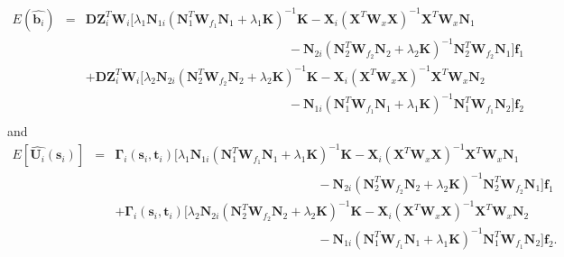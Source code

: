 \documentclass[article,lineno]{biometrika}
\begin{document}
\begin{eqnarray*}
E(\hat {\boldsymbol b_i}) 
&=& 
\boldsymbol D \boldsymbol Z_i^T \boldsymbol W_i 
[
\lambda_1 \boldsymbol N_{1i}
 (\boldsymbol N_1^T \boldsymbol W_{f_1}  \boldsymbol N_1 + \lambda_1 \boldsymbol K)^{-1}  
\boldsymbol K
-  
\boldsymbol X_i(\boldsymbol X^T  \boldsymbol W_x \boldsymbol X )^{-1} \boldsymbol X^T  \boldsymbol W_x  \boldsymbol N_1
\\
&& 
\quad\quad\quad\quad \quad \quad \quad \quad \quad \quad \quad \quad \quad \quad\quad \quad
-
 \boldsymbol N_{2i}
(\boldsymbol N_2^T \boldsymbol W_{f_2}  \boldsymbol N_2 + \lambda_2 \boldsymbol K)^{-1}  \boldsymbol N_2^T \boldsymbol W_{f_2} 
\boldsymbol N_{1} 
 ]
  \boldsymbol f_1  
\\
&& 
+
\boldsymbol D \boldsymbol Z_i^T \boldsymbol W_i 
[
\lambda_2 \boldsymbol N_{2i}
(\boldsymbol N_2^T \boldsymbol W_{f_2}  \boldsymbol N_2 + \lambda_2 \boldsymbol K)^{-1}
  \boldsymbol K
-  
\boldsymbol X_i(\boldsymbol X^T  \boldsymbol W_x \boldsymbol X )^{-1} \boldsymbol X^T  \boldsymbol W_x  \boldsymbol N_2
\\
&& 
\quad\quad\quad\quad \quad \quad \quad \quad \quad \quad \quad \quad \quad \quad\quad \quad
-
 \boldsymbol N_{1i}
 (\boldsymbol N_1^T \boldsymbol W_{f_1}  \boldsymbol N_1 + \lambda_1 \boldsymbol K)^{-1}  
\boldsymbol N_1^T \boldsymbol W_{f_1}
\boldsymbol N_2
 ]
  \boldsymbol f_2 \\
  \end{eqnarray*}
and
 \begin{eqnarray*}
E\left[
\hat {\boldsymbol U_i}(\boldsymbol s_i) 
\right] 
&=& 
\boldsymbol \Gamma_i(\boldsymbol s_i, \boldsymbol t_i) 
[
\lambda_1 \boldsymbol N_{1i}
 (\boldsymbol N_1^T \boldsymbol W_{f_1}  \boldsymbol N_1 + \lambda_1 \boldsymbol K)^{-1}  
\boldsymbol K
-  
\boldsymbol X_i(\boldsymbol X^T  \boldsymbol W_x \boldsymbol X )^{-1} \boldsymbol X^T  \boldsymbol W_x  \boldsymbol N_1
\\
&&
\quad\quad \quad \quad \quad \quad \quad\quad \quad \quad \quad \quad\quad \quad\quad\quad
-
 \boldsymbol N_{2i}
(\boldsymbol N_2^T \boldsymbol W_{f_2}  \boldsymbol N_2 + \lambda_2 \boldsymbol K)^{-1}  \boldsymbol N_2^T \boldsymbol W_{f_2} 
\boldsymbol N_{1} 
 ]
  \boldsymbol f_1  
\\
&&
+
\boldsymbol \Gamma_i(\boldsymbol s_i, \boldsymbol t_i) 
[
\lambda_2 \boldsymbol N_{2i}
(\boldsymbol N_2^T \boldsymbol W_{f_2}  \boldsymbol N_2 + \lambda_2 \boldsymbol K)^{-1}
  \boldsymbol K
-  
\boldsymbol X_i(\boldsymbol X^T  \boldsymbol W_x \boldsymbol X )^{-1} \boldsymbol X^T  \boldsymbol W_x  \boldsymbol N_2
\\
&& 
\quad \quad \quad \quad \quad \quad \quad \quad \quad \quad \quad\quad\quad\quad\quad\quad
-
 \boldsymbol N_{1i}
 (\boldsymbol N_1^T \boldsymbol W_{f_1}  \boldsymbol N_1 + \lambda_1 \boldsymbol K)^{-1}  
\boldsymbol N_1^T \boldsymbol W_{f_1}
\boldsymbol N_2
 ]
  \boldsymbol f_2 .
  \end{eqnarray*}
\end{document}
